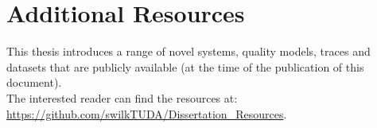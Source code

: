 

\chapter{Additional Resources}
\label{app:repository}
This thesis introduces a range of novel systems, quality models, traces and datasets that are publicly available (at the time of the publication of this document).\\

The interested reader can find the resources at:\\ \url{https://github.com/swilkTUDA/Dissertation_Resources}.  


